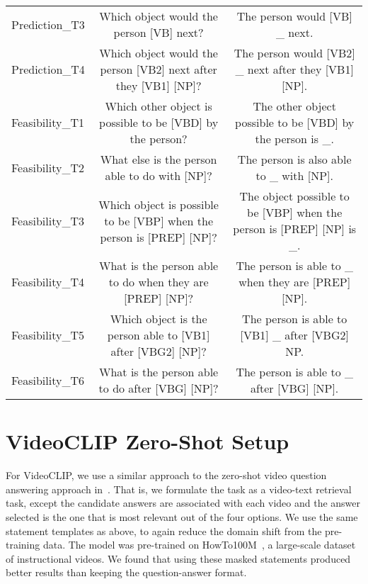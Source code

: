 \begin{landscape}
\begin{table}[htpb]
\begin{tabular}{lcc}
        Prediction\_T3 & Which object would the person [VB] next? & The person would [VB] \_ next. \\
        Prediction\_T4 & Which object would the person [VB2] next after they [VB1] [NP]? & The person would [VB2] \_ next after they [VB1] [NP]. \\
        \midrule
        Feasibility\_T1 & Which other object is possible to be [VBD] by the person? & The other object possible to be [VBD] by the person is \_. \\
        Feasibility\_T2 & What else is the person able to do with [NP]? & The person is also able to \_ with [NP]. \\
        Feasibility\_T3 & Which object is possible to be [VBP] when the person is [PREP] [NP]? & The object possible to be [VBP] when the person is [PREP] [NP] is \_. \\
        Feasibility\_T4 & What is the person able to do when they are [PREP] [NP]? & The person is able to \_ when they are [PREP] [NP]. \\
        Feasibility\_T5 & Which object is the person able to [VB1] after [VBG2] [NP]? & The person is able to [VB1] \_ after [VBG2] NP. \\
        Feasibility\_T6 & What is the person able to do after [VBG] [NP]? & The person is able to \_ after [VBG] [NP]. \\
        \bottomrule
    \end{tabular}
\end{table}
\end{landscape}
\normalsize


\section{VideoCLIP Zero-Shot Setup}
\label{sec:videoclip_zs}

For VideoCLIP, we use a similar approach to the zero-shot video question
answering approach in~\citet{xu2021videoclip}. That is, we formulate the task
as a video-text retrieval task, except the candidate answers are associated
with each video and the answer selected is the one that is most relevant out of
the four options. We use the same statement templates as above, to again reduce
the domain shift from the pre-training data. The model was pre-trained on
HowTo100M~\citep{miech2019howto100m}, a large-scale dataset of instructional
videos. We found that using these masked statements produced better results
than keeping the question-answer format.

